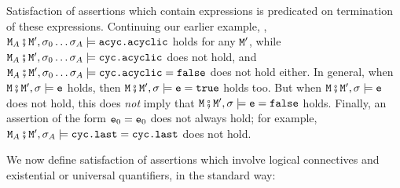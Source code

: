 Satisfaction of assertions which contain expressions is predicated on termination of these expressions.
Continuing our earlier example, ,  
$\M_A\mkpair \M', \sigma_0\ldots\sigma_A \models \prg{acyc.acyclic}$ holds for any $\M'$, while $\M_A\mkpair \M', \sigma_0\ldots\sigma_A \models \prg{cyc.acyclic}$
does not hold, and $\M_A\mkpair \M', \sigma_0\ldots\sigma_A \models \prg{cyc.acyclic}=\prg{false}$ does not hold either.
In general, when $\M\mkpair \M', \sigma  \models \prg{e}$ holds,  then $\M\mkpair \M', \sigma  \models \prg{e}=\prg{true}$ holds too.
But when $\M\mkpair \M', \sigma  \models \prg{e}$ does not hold, this does \emph{not} imply that $\M\mkpair \M', \sigma  \models \prg{e}=\prg{false}$ holds.
Finally, an assertion of the form $\e_0=\e_0$ does not always hold; for example,   $\M_A\mkpair \M', \sigma_A \models \prg{cyc.last}=\prg{cyc.last}$ does not hold.


We now define satisfaction of assertions which involve logical connectives and existential or universal quantifiers, in the standard way:

